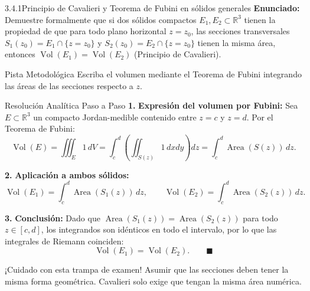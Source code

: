 \documentclass[11pt,a4paper]{article}
\begin{document}
\begin{nivelbox}{3.4.1}{Principio de Cavalieri y Teorema de Fubini en sólidos generales}
\textbf{Enunciado:}\\
Demuestre formalmente que si dos sólidos compactos $E_1, E_2 \subset \mathbb{R}^3$ tienen la propiedad de que para todo plano horizontal $z = z_0$, las secciones transversales $S_1(z_0) = E_1 \cap \{z = z_0\}$ y $S_2(z_0) = E_2 \cap \{z = z_0\}$ tienen la misma área, entonces $\operatorname{Vol}(E_1) = \operatorname{Vol}(E_2)$ (Principio de Cavalieri).

\begin{observacionbox}{Pista Metodológica}
Escriba el volumen mediante el Teorema de Fubini integrando las áreas de las secciones respecto a $z$.
\end{observacionbox}

\begin{ejerciciobox}{Resolución Analítica Paso a Paso}
\smallskip\noindent\textbf{1.} \textbf{Expresión del volumen por Fubini:}
Sea $E \subset \mathbb{R}^3$ un compacto Jordan-medible contenido entre $z = c$ y $z = d$. Por el Teorema de Fubini:
\[\operatorname{Vol}(E) = \iiint_E 1 \, dV = \int_c^d \left( \iint_{S(z)} 1 \, dx dy \right) dz = \int_c^d \operatorname{Area}(S(z)) \, dz.\]

\smallskip\noindent\textbf{2.} \textbf{Aplicación a ambos sólidos:}
\[\operatorname{Vol}(E_1) = \int_c^d \operatorname{Area}(S_1(z)) \, dz, \qquad \operatorname{Vol}(E_2) = \int_c^d \operatorname{Area}(S_2(z)) \, dz.\]

\smallskip\noindent\textbf{3.} \textbf{Conclusión:}
Dado que $\operatorname{Area}(S_1(z)) = \operatorname{Area}(S_2(z))$ para todo $z \in [c, d]$, los integrandos son idénticos en todo el intervalo, por lo que las integrales de Riemann coinciden:
\[\operatorname{Vol}(E_1) = \operatorname{Vol}(E_2). \qquad \blacksquare\]
\end{ejerciciobox}

\begin{errorbox}{¡Cuidado con esta trampa de examen!}
Asumir que las secciones deben tener la misma forma geométrica. Cavalieri solo exige que tengan la misma área numérica.
\end{errorbox}
\end{nivelbox}
\bigskip
\end{document}
